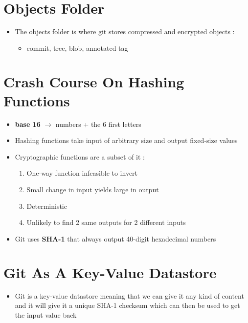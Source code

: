 \documentclass{report}
\begin{document}
\section{Objects Folder}

\begin{itemize}
	\item The objects folder is where git stores compressed and encrypted objects :
		\begin{itemize}
			\item commit, tree, blob, annotated tag
		\end{itemize}
\end{itemize}


\section{Crash Course On Hashing Functions}

\begin{itemize}
	\item \textbf{base 16} $\rightarrow$ numbers + the 6 first letters 
	\item Hashing functions take input of arbitrary size and output fixed-size values 
	\item Cryptographic functions are a subset of it :
		\begin{enumerate}
			\item One-way function infeasible to invert 
			\item Small change in input yields large in output 
			\item Deterministic 
			\item Unlikely to find 2 same outputs for 2 different inputs
		\end{enumerate}
	\item Git uses \textbf{SHA-1} that always output 40-digit hexadecimal numbers
\end{itemize}


\section{Git As A Key-Value Datastore}

\begin{itemize}
	\item Git is a key-value datastore meaning that we can give it any kind of content and it will give it a unique SHA-1 checksum which can then be used to get the input value back
\end{itemize}
\end{document}
